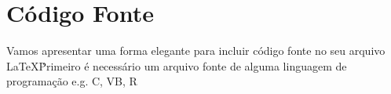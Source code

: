 \documentclass[12pt, a4paper]{article}
\begin{document}
\section{Código Fonte}
Vamos apresentar uma forma elegante para incluir código fonte no seu arquivo \LaTeX\. Primeiro é necessário um arquivo fonte de alguma linguagem de programação e.g. C, VB, R




\end{document}
